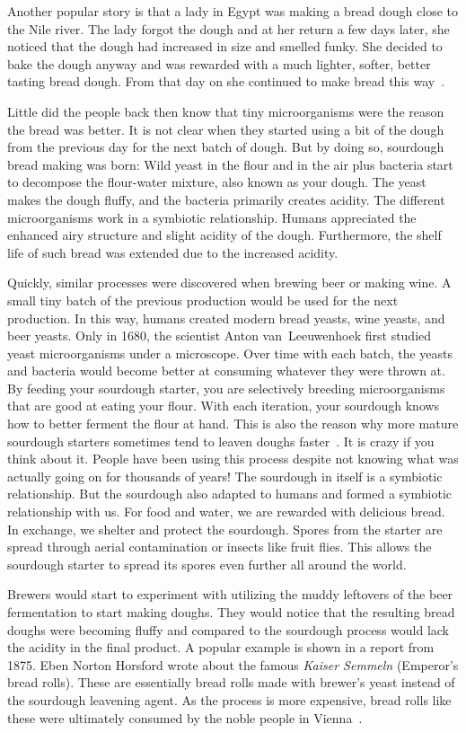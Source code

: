 Another popular story is that a lady in Egypt was making
a bread dough close to the Nile river. The lady forgot the
dough and at her return a few days later, she noticed that the dough had
increased in size and smelled funky. She decided to bake
the dough anyway and was rewarded with a much
lighter, softer, better tasting bread dough. From that day
on she continued to make bread this way~\cite{egyptian+bread}.

Little did the people back then know that tiny microorganisms
were the reason the bread was better. It is not clear when
they started using a bit of the dough from the previous
day for the next batch of dough. But by doing so, sourdough
bread making was born: Wild yeast in the flour and in the air
plus bacteria start to decompose the flour-water mixture, also
known as your dough. The yeast makes the dough fluffy, and
the bacteria primarily creates acidity. The different
microorganisms work in a symbiotic relationship. Humans
appreciated the enhanced airy structure and slight acidity
of the dough. Furthermore, the shelf life of such bread
was extended due to the increased acidity.

Quickly, similar processes were discovered when brewing beer
or making wine. A small tiny batch of the previous production
would be used for the next production. In this way, humans created
modern bread yeasts, wine yeasts, and beer yeasts. Only in 1680,
the scientist Anton van~Leeuwenhoek first studied yeast microorganisms
under a microscope. Over time with each batch, the yeasts and bacteria
would become better at consuming whatever they were thrown at.
By feeding your sourdough starter, you are selectively breeding
microorganisms that are good at eating your flour. With
each iteration, your sourdough knows how to better ferment the flour
at hand. This is also the reason why more mature sourdough starters sometimes
tend to leaven doughs faster~\cite{review+of+sourdough+starters}. It is crazy if you
think about it. People have been using this process despite not
knowing what was actually going on for thousands of years! The
sourdough in itself is a symbiotic relationship. But the sourdough
also adapted to humans and formed a symbiotic relationship with us.
For food and water, we are rewarded with delicious bread. In exchange,
we shelter and protect the sourdough. Spores from the starter
are spread through aerial contamination or insects like fruit flies.
This allows the sourdough starter to spread its spores even
further all around the world.

Brewers would start to experiment with utilizing the muddy leftovers
of the beer fermentation to start making doughs. They would notice
that the resulting bread doughs were becoming fluffy and compared
to the sourdough process would lack the acidity in the final product.
A popular example is shown in a report from 1875. Eben Norton Horsford
wrote about the famous \emph{Kaiser Semmeln} (Emperor's bread rolls).
These are essentially bread rolls made with brewer's yeast instead
of the sourdough leavening agent. As the process is more expensive,
bread rolls like these were ultimately consumed by the noble people
in Vienna~\cite{vienna+breadrolls}.

